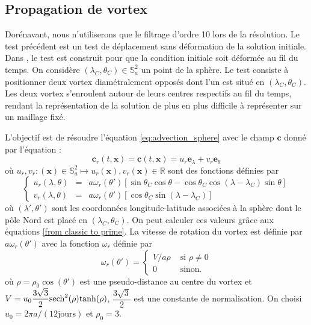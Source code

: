 \subsection{Propagation de vortex}

Dorénavant, nous n'utiliserons que le filtrage d'ordre 10 lors de la résolution. Le test précédent est un test de déplacement sans déformation de la solution initiale. Dans \cite{Nair2002}, le test est construit pour que la condition initiale soit déformée au fil du temps.
On considère $(\lambda_C, \theta_C) \in \mathbb{S}_a^2$ un point de la sphère. Le test consiste à positionner deux vortex diamétralement opposés dont l'un est situé en $(\lambda_C, \theta_C)$. Les deux vortex s'enroulent autour de leurs centres respectifs au fil du temps, rendant la représentation de la solution de plus en plus difficile à représenter sur un maillage fixé.

L'objectif est de résoudre l'équation \eqref{eq:advection_sphere} avec le champ $\mathbf{c}$ donné par l'équation :
\begin{equation}
\mathbf{c}_r(t,\mathbf{x}) = \mathbf{c}(t, \mathbf{x}) = u_r \mathbf{e}_{\lambda} + v_r \mathbf{e}_{\theta}
\label{eq:rotation_vortex}
\end{equation}
où $u_r, v_r : (\mathbf{x}) \in \mathbb{S}_a^2 \mapsto u_r(\mathbf{x}), v_r(\mathbf{x}) \in \mathbb{R}$ sont des fonctions définies par
\begin{equation}
\left\lbrace
\begin{array}{rcl}
u_r(\lambda, \theta) & = & a \omega_r(\theta') \left[ \sin \theta_C \cos \theta - \cos \theta_C \cos (\lambda - \lambda_C) \sin \theta \right] \\
v_r(\lambda, \theta) & = & a \omega_r (\theta') \left[\cos \theta_C \sin (\lambda - \lambda_C)  \right]
\end{array}
\right.
\end{equation}
où $(\lambda', \theta')$ sont les coordonnées longitude-latitude associées à la sphère dont le pôle Nord est placé en $(\lambda_C, \theta_C)$. On peut calculer ces valeurs grâce aux équations \eqref{from classic to prime}.
La vitesse de rotation du vortex est définie par $a \omega_r(\theta')$ avec la fonction $\omega_r$ définie par
\begin{equation}
\omega_r(\theta') = \left\lbrace
\begin{array}{cl}
V/a\rho & \text{ si } \rho \neq 0 \\
0 & \text{ sinon.}
\end{array}
\right.
\end{equation}
où $\rho = \rho_0 \cos (\theta')$ est une pseudo-distance au centre du vortex et $V=u_0 \dfrac{3 \sqrt{3}}{2} \text{sech}^2 (\rho) \text{tanh} (\rho)$, $\dfrac{3 \sqrt{3}}{2}$ est une constante de normalisation. On choisi $u_0 = 2 \pi a / (12 \text{jours})$ et $\rho_0 = 3$.

